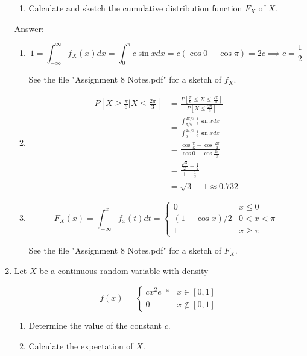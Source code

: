 \documentclass{article}
\begin{document}
\begin{enumerate}
\begin{enumerate}
\item Calculate and sketch the cumulative distribution function $F_X$ of $X$. 
\end{enumerate}

Answer: 

\begin{enumerate}
\item
$$
1 = \int_{-\infty}^\infty f_X(x) dx = \int_0^\pi c\sin x dx = c(\cos 0 - \cos \pi ) = 2c \implies \boxed{c = \frac{1}{2}}
$$

See the file "Assignment 8 Notes.pdf" for a sketch of $f_X$.

\item  
\begin{align*}
P[X \geq \frac{\pi}{6} \vert X \leq \frac{2\pi}{3}] &= \frac{P[\frac{\pi}{6} \leq X \leq \frac{2\pi}{3}]}{P[X \leq \frac{2\pi}{3}]} \\
&= \frac{\int_{\pi/6}^{2\pi / 3} \frac{1}{2}\sin x dx}{\int_{0}^{2\pi / 3} \frac{1}{2}\sin x dx} \\
&= \frac{\cos \frac{\pi}{6} - \cos \frac{2\pi}{3}}{\cos 0 - \cos \frac{2\pi}{3}} \\
&= \frac{\frac{\sqrt{3}}{2} - \frac{1}{2} }{1 - \frac{1}{2}}\\ 
&= \boxed{\sqrt{3} - 1 \approx 0.732}
\end{align*}

\item 
$$
F_X(x) = \int_{-\infty}^x f_x(t) dt =
\begin{cases}
0 & x \leq 0 \\
(1-\cos x) / 2 & 0 < x < \pi \\
1 & x \geq \pi
\end{cases}
$$

See the file "Assignment 8 Notes.pdf" for a sketch of $F_X$. 
\end{enumerate}


\newpage
\item

Let $X$ be a continuous random variable with density

$$
f(x) = \begin{cases}
cx^2e^{-x} & x \in [0,1] \\
0 & x \notin [0,1]
\end{cases}
$$

\begin{enumerate}
\item Determine the value of the constant $c$.

\item Calculate the expectation of $X$. 
\end{enumerate}


\end{enumerate}
\end{document}
